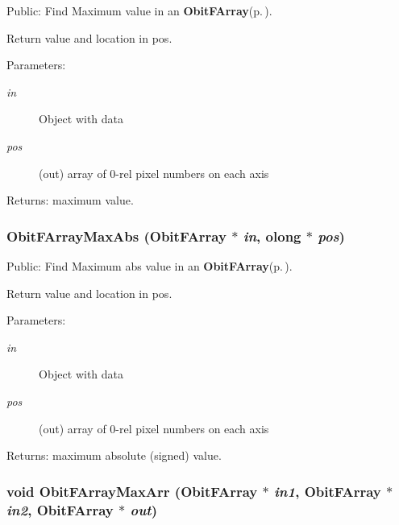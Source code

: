 Public: Find Maximum value in an {\bf Obit\-FArray}{\rm (p.\,\pageref{structObitFArray})}. 

Return value and location in pos. \begin{Desc}
\item[Parameters:]
\begin{description}
\item[{\em in}]Object with data \item[{\em pos}](out) array of 0-rel pixel numbers on each axis \end{description}
\end{Desc}
\begin{Desc}
\item[Returns:]maximum value. \end{Desc}
\subsubsection{ Obit\-FArray\-Max\-Abs ({\bf Obit\-FArray} $\ast$ {\em in}, {\bf olong} $\ast$ {\em pos})}\label{ObitFArray_8c_a25}


Public: Find Maximum abs value in an {\bf Obit\-FArray}{\rm (p.\,\pageref{structObitFArray})}. 

Return value and location in pos. \begin{Desc}
\item[Parameters:]
\begin{description}
\item[{\em in}]Object with data \item[{\em pos}](out) array of 0-rel pixel numbers on each axis \end{description}
\end{Desc}
\begin{Desc}
\item[Returns:]maximum absolute (signed) value. \end{Desc}
\subsubsection{\setlength{\rightskip}{0pt plus 5cm}void Obit\-FArray\-Max\-Arr ({\bf Obit\-FArray} $\ast$ {\em in1}, {\bf Obit\-FArray} $\ast$ {\em in2}, {\bf Obit\-FArray} $\ast$ {\em out})}\label{ObitFArray_8c_a48}


